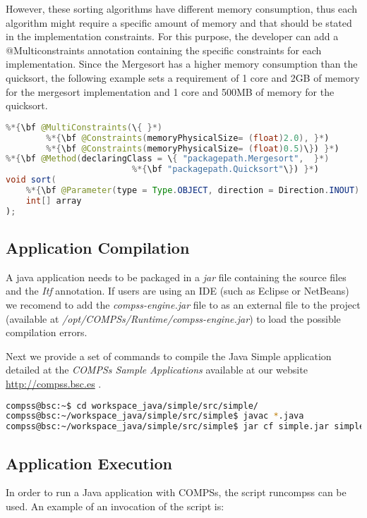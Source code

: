 However, these sorting algorithms have different memory consumption, thus each algorithm might require a
specific amount of memory and that should be stated in the implementation constraints. For this purpose, the
developer can add a @Multiconstraints annotation containing the specific constraints for each
implementation. Since the Mergesort has a higher memory consumption than the quicksort, the following
example sets a requirement of 1 core and 2GB of memory for the mergesort implementation and 1 core and
500MB of memory for the quicksort.

\begin{lstlisting}[language=java]
%*{\bf @Constraints(processorCoreCount = 1) }*)
%*{\bf @MultiConstraints(\{ }*)
        %*{\bf @Constraints(memoryPhysicalSize= (float)2.0), }*)
        %*{\bf @Constraints(memoryPhysicalSize= (float)0.5)\}) }*)
%*{\bf @Method(declaringClass = \{ "packagepath.Mergesort",  }*)
                         %*{\bf "packagepath.Quicksort"\}) }*)
void sort(
    %*{\bf @Parameter(type = Type.OBJECT, direction = Direction.INOUT) }*)
    int[] array
);
\end{lstlisting}

\subsection{Application Compilation}
A java application needs to be packaged in a \textit{jar} file containing the source files and the \textit{Itf} annotation. If users
are using an IDE (such as Eclipse or NetBeans) we recomend to add the \textit{compss-engine.jar} file to as an external file to the
project (available at \textit{/opt/COMPSs/Runtime/compss-engine.jar}) to load the possible compilation errors. 

Next we provide a set of commands to compile the Java Simple application detailed at the \textit{COMPSs Sample Applications} 
available at our website \url{http://compss.bsc.es} .
\begin{lstlisting}[language=bash]
compss@bsc:~$ cd workspace_java/simple/src/simple/
compss@bsc:~/workspace_java/simple/src/simple$ javac *.java
compss@bsc:~/workspace_java/simple/src/simple$ jar cf simple.jar simple 
\end{lstlisting}

\subsection{Application Execution}
In order to run a Java application with COMPSs, the script runcompss can be used. An example of an invocation of the script is:

